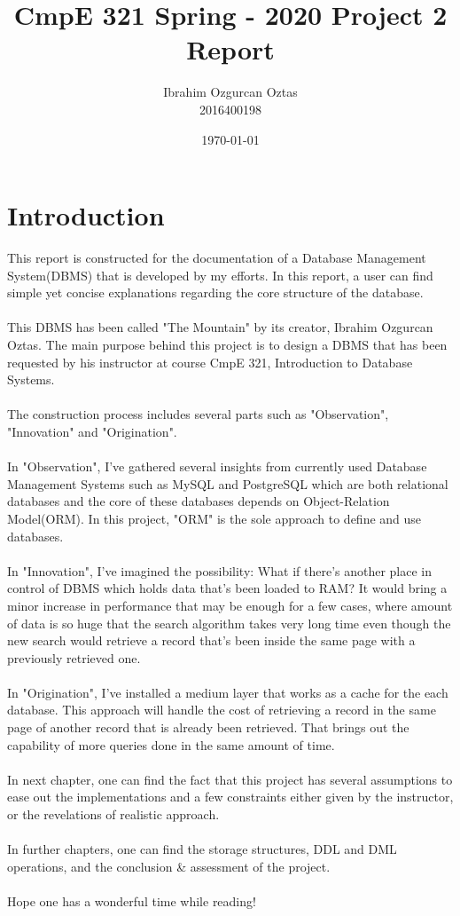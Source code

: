 \documentclass[12pt]{report}
\title{\bf{CmpE 321 Spring - 2020 Project 2 Report}}
\author{Ibrahim Ozgurcan Oztas \\ 2016400198}
\date{\today}
\begin{document}
\maketitle
{}
\newpage
\tableofcontents

\chapter{Introduction}
This report is constructed for the documentation of a Database Management System(DBMS) that is developed by my efforts. In this report, a user can find simple yet concise explanations regarding the core structure of the database. \\\\
This DBMS has been called "The Mountain" by its creator, Ibrahim Ozgurcan Oztas. The main purpose behind this project is to design a DBMS that has been requested by his instructor at course CmpE 321, Introduction to Database Systems. \\\\
The construction process includes several parts such as "Observation", "Innovation" and "Origination". \\\\
In "Observation", I've gathered several insights from currently used Database Management Systems such as MySQL and PostgreSQL which are both relational databases and the core of these databases depends on Object-Relation Model(ORM). In this project, "ORM" is the sole approach to define and use databases. \\\\
In "Innovation", I've imagined the possibility: What if there's another place in control of DBMS which holds data that's been loaded to RAM? It would bring a minor increase in performance that may be enough for a few cases, where amount of data is so huge that the search algorithm takes very long time even though the new search would retrieve a record that's been inside the same page with a previously retrieved one. \\\\
In "Origination", I've installed a medium layer that works as a cache for the each database. This approach will handle the cost of retrieving a record in the same page of another record that is already been retrieved. That brings out the capability of more queries done in the same amount of time. \\\\
In next chapter, one can find the fact that this project has several assumptions to ease out the implementations and a few constraints either given by the instructor, or the revelations of realistic approach. \\\\ 
In further chapters, one can find the storage structures, DDL and DML operations, and the conclusion \& assessment of the project. \\\\
Hope one has a wonderful time while reading!
\end{document}
